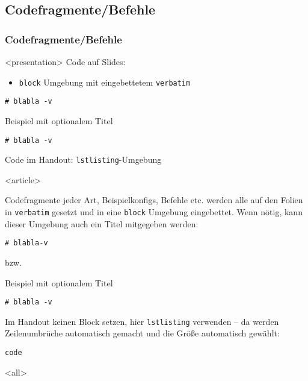 \subsection{Codefragmente/Befehle}
\begin{frame}[fragile]
\frametitle<presentation>{Codefragmente/Befehle}


\mode
<presentation>
Code auf Slides:
\begin{itemize}
 \item \texttt{block} Umgebung mit eingebettetem \texttt{verbatim}
\end{itemize}

\begin{block}{}
\begin{verbatim}
# blabla -v
\end{verbatim}
\end{block}

\begin{block}{Beispiel mit optionalem Titel}
\begin{verbatim}
# blabla -v
\end{verbatim}
\end{block}

Code im Handout: \texttt{lstlisting}-Umgebung


\mode
<article>

Codefragmente jeder Art, Beispielkonfigs, Befehle etc. werden alle auf den Folien in \texttt{verbatim} gesetzt und in eine \texttt{block} Umgebung eingebettet. Wenn nötig, kann dieser Umgebung auch ein Titel mitgegeben werden:


\begin{block}{}
\begin{verbatim}
# blabla-v
\end{verbatim}
\end{block}

bzw.

\begin{block}{Beispiel mit optionalem Titel}
\begin{verbatim}
# blabla -v
\end{verbatim}
\end{block}

Im Handout keinen Block setzen, hier \texttt{lstlisting} verwenden -- da werden Zeilenumbrüche automatisch gemacht und die Größe automatisch gewählt:
\begin{lstlisting}
code
\end{lstlisting}



\mode
<all>

\end{frame}

